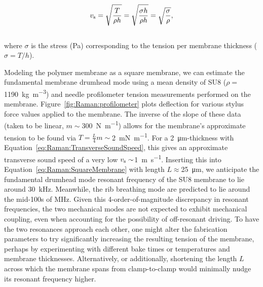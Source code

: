 \begin{equation}
  v_{\rm s} = \sqrt{\frac{T}{\rho h}} = \sqrt{\frac{\sigma h}{\rho h}} = \sqrt{\frac{\sigma}{\rho}},
  \label{eq:Raman:TransverseSoundSpeed}
\end{equation}
\\
where \(\sigma\) is the stress (\si{\pascal}) corresponding to the tension per membrane thickness (\(\sigma = T/h\)).

Modeling the polymer membrane as a square membrane, we can estimate the fundamental membrane drumhead mode using a mean density of SU8 (\(\rho=\)\SI{1190}{\kilo\gram\per\cubic\meter}) \cite{roch2003fabrication} and needle profilometer tension measurements performed on the membrane. Figure~\ref{fig:Raman:profilometer} plots deflection for various stylus force values applied to the membrane. The inverse of the slope of these data (taken to be linear, \(m\sim\)\SI{300}{\newton\per\meter}) allows for the membrane's approximate tension to be found via \(T=\frac{L}{4}m\sim\)\SI{2}{\milli\newton\per\meter}. For a \SI{2}{\micro\meter}-thickness with Equation~\ref{eq:Raman:TransverseSoundSpeed}, this gives an approximate transverse sound speed of a very low \(v_{\rm s}\sim\)\SI{1}{\meter\per\second}. Inserting this into Equation~\ref{eq:Raman:SquareMembrane} with length \(L\approx\)\SI{25}{\micro\meter}, we anticipate the fundamental drumhead mode resonant frequency of the SU8 membrane to lie around \SI{30}{\kilo\hertz}. Meanwhile, the rib breathing mode are predicted to lie around the mid-100s of \si{\mega\hertz}. Given this 4-order-of-magnitude discrepancy in resonant frequencies, the two mechanical modes are not expected to exhibit mechanical coupling, even when accounting for the possibility of off-resonant driving. To have the two resonances approach each other, one might alter the fabrication parameters to try significantly increasing the resulting tension of the membrane, perhaps by experimenting with different bake times or temperatures and membrane thicknesses. Alternatively, or additionally, shortening the length \(L\) across which the membrane spans from clamp-to-clamp would minimally nudge its resonant frequency higher.

